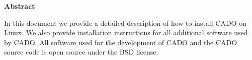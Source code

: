 
\clearemptydoublepage
{}
{}	

\vspace*{2cm}
\begin{center}
{\Large \bf Abstract}
\end{center}
\vspace{1cm}
In this document we provide a detailed description of how to install CADO on Linux. We also provide installation instructions for all additional software used by CADO. All software used for the development of CADO and the CADO source code is open source under the BSD license.
